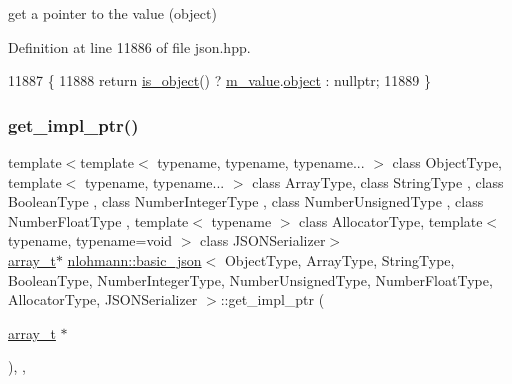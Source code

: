 get a pointer to the value (object) 



Definition at line 11886 of file json.\+hpp.


\begin{DoxyCode}
11887     \{
11888         \textcolor{keywordflow}{return} \hyperlink{classnlohmann_1_1basic__json_af8f511af124e82e4579f444b4175787c}{is\_object}() ? \hyperlink{classnlohmann_1_1basic__json_aeb0814f76966f99290cb29e127c90a77}{m\_value}.\hyperlink{unionnlohmann_1_1basic__json_1_1json__value_a4a2209bb26e7088cd36bf24824ab5521}{object} : \textcolor{keyword}{nullptr};
11889     \}
\end{DoxyCode}
\mbox{\label{classnlohmann_1_1basic__json_a0a9c36d4d94ef5d611c0204bc7e4d37f}} 
\subsubsection{\texorpdfstring{get\+\_\+impl\+\_\+ptr()}{get\_impl\_ptr()}\hspace{0.1cm}{\footnotesize\ttfamily [3/14]}}
{\footnotesize\ttfamily template$<$template$<$ typename, typename, typename... $>$ class Object\+Type, template$<$ typename, typename... $>$ class Array\+Type, class String\+Type , class Boolean\+Type , class Number\+Integer\+Type , class Number\+Unsigned\+Type , class Number\+Float\+Type , template$<$ typename $>$ class Allocator\+Type, template$<$ typename, typename=void $>$ class J\+S\+O\+N\+Serializer$>$ \\
\hyperlink{classnlohmann_1_1basic__json_ae095578e03df97c5b3991787f1056374}{array\+\_\+t}$\ast$ \hyperlink{classnlohmann_1_1basic__json}{nlohmann\+::basic\+\_\+json}$<$ Object\+Type, Array\+Type, String\+Type, Boolean\+Type, Number\+Integer\+Type, Number\+Unsigned\+Type, Number\+Float\+Type, Allocator\+Type, J\+S\+O\+N\+Serializer $>$\+::get\+\_\+impl\+\_\+ptr (\begin{DoxyParamCaption}\item[{\hyperlink{classnlohmann_1_1basic__json_ae095578e03df97c5b3991787f1056374}{array\+\_\+t} $\ast$}]{ }\end{DoxyParamCaption})\hspace{0.3cm}{\ttfamily [inline]}, {\ttfamily [private]}, {\ttfamily [noexcept]}}



